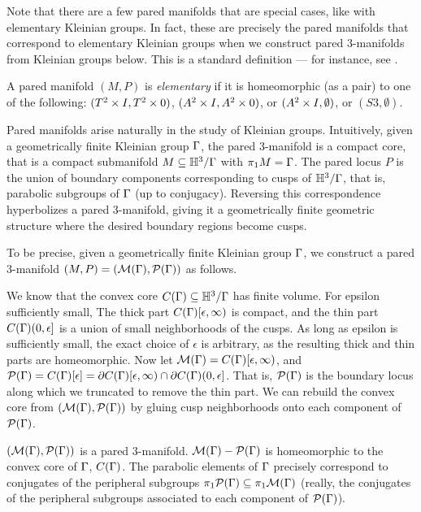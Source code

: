 Note that there are a few pared manifolds that are special cases, like with
elementary Kleinian groups. In fact, these are precisely the pared manifolds
that correspond to elementary Kleinian groups when we construct pared
$3$-manifolds from Kleinian groups below. This is a standard definition --- for
instance, see \cite[pp88]{CMc}.

\begin{defn}

A pared manifold $(M,P)$ is \emph{elementary} if it is homeomorphic (as a pair)
to one of the following: $(T^2\times I,T^2\times 0)$, $(A^2\times I,A^2\times 0)$, or $(A^2\times
I,\emptyset)$, or $(S3,\emptyset)$.

\end{defn}

Pared manifolds arise naturally in the study of Kleinian groups. Intuitively,
given a geometrically finite Kleinian group $\Gamma$, the pared $3$-manifold is
a compact core, that is a compact submanifold $M \subseteq \mathbb{H}^3/\Gamma$ with $\pi_1M
= \Gamma$.  The pared locus $P$ is the union of boundary components corresponding
to cusps of $\mathbb{H}^3/\Gamma$, that is, parabolic subgroups of $\Gamma$ (up to
conjugacy).  Reversing this correspondence hyperbolizes a pared $3$-manifold,
giving it a geometrically finite geometric structure where the desired boundary
regions become cusps.

To be precise, given a geometrically finite Kleinian group $\Gamma$, we construct
a pared $3$-manifold $(M,P)=(\mathcal{M}(\Gamma),\mathcal{P}(\Gamma))$ as follows.

We know that the convex core $C(\Gamma) \subseteq \mathbb{H}^3/\Gamma$ has finite volume. For
epsilon sufficiently small, The thick part $C(\Gamma)[\epsilon,\infty)$ is
compact, and the thin part $C(\Gamma)(0,\epsilon]$ is a union of small
neighborhoods of the cusps.  As long as epsilon is sufficiently small, the
exact choice of $\epsilon$ is arbitrary, as the resulting thick and thin parts
are homeomorphic.  Now let $\mathcal{M}(\Gamma) = C(\Gamma)[\epsilon,\infty)$, and $\mathcal{P}(\Gamma)
= C(\Gamma)[\epsilon] = \partial C(\Gamma)[\epsilon,\infty) \cap \partial C(\Gamma)(0,\epsilon]$.
That is, $\mathcal{P}(\Gamma)$ is the boundary locus along which we truncated to remove
the thin part. We can rebuild the convex core from $(\mathcal{M}(\Gamma),\mathcal{P}(\Gamma))$ by
gluing cusp neighborhoods onto each component of $\mathcal{P}(\Gamma)$.

\begin{prop}

$(\mathcal{M}(\Gamma),\mathcal{P}(\Gamma))$ is a pared $3$-manifold. $\mathcal{M}(\Gamma)- \mathcal{P}(\Gamma)$ is
homeomorphic to the convex core of $\Gamma$, $C(\Gamma)$. The parabolic elements of
$\Gamma$ precisely correspond to conjugates of the peripheral subgroups
$\pi_1\mathcal{P}(\Gamma) \subseteq \pi_1\mathcal{M}(\Gamma)$ (really, the conjugates of the peripheral
subgroups associated to each component of $\mathcal{P}(\Gamma)$).

\end{prop}

